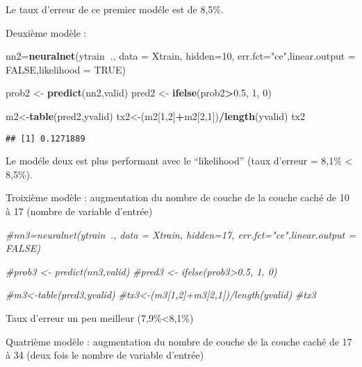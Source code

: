 \documentclass[
]{article}
\newenvironment{Shaded}{\begin{snugshade}}{\end{snugshade}}
\newcommand{\CommentTok}[1]{\textcolor[rgb]{0.56,0.35,0.01}{\textit{#1}}}
\newcommand{\DataTypeTok}[1]{\textcolor[rgb]{0.13,0.29,0.53}{#1}}
\newcommand{\DecValTok}[1]{\textcolor[rgb]{0.00,0.00,0.81}{#1}}
\newcommand{\FloatTok}[1]{\textcolor[rgb]{0.00,0.00,0.81}{#1}}
\newcommand{\KeywordTok}[1]{\textcolor[rgb]{0.13,0.29,0.53}{\textbf{#1}}}
\newcommand{\NormalTok}[1]{#1}
\newcommand{\OperatorTok}[1]{\textcolor[rgb]{0.81,0.36,0.00}{\textbf{#1}}}
\newcommand{\OtherTok}[1]{\textcolor[rgb]{0.56,0.35,0.01}{#1}}
\newcommand{\StringTok}[1]{\textcolor[rgb]{0.31,0.60,0.02}{#1}}
\begin{document}
Le taux d'erreur de ce premier modéle est de 8,5\%.

Deuxième modèle :

\begin{Shaded}
\begin{Highlighting}[]
\NormalTok{nn2=}\KeywordTok{neuralnet}\NormalTok{(ytrain}\OperatorTok{~}\NormalTok{., }\DataTypeTok{data =}\NormalTok{ Xtrain, }\DataTypeTok{hidden=}\DecValTok{10}\NormalTok{, }\DataTypeTok{err.fct=}\StringTok{"ce"}\NormalTok{,}\DataTypeTok{linear.output =} \OtherTok{FALSE}\NormalTok{,}\DataTypeTok{likelihood =} \OtherTok{TRUE}\NormalTok{)}

\NormalTok{prob2 <-}\StringTok{ }\KeywordTok{predict}\NormalTok{(nn2,valid)}
\NormalTok{pred2 <-}\StringTok{ }\KeywordTok{ifelse}\NormalTok{(prob2}\OperatorTok{>}\FloatTok{0.5}\NormalTok{, }\DecValTok{1}\NormalTok{, }\DecValTok{0}\NormalTok{)}

\NormalTok{m2<-}\KeywordTok{table}\NormalTok{(pred2,yvalid)}
\NormalTok{tx2<-(m2[}\DecValTok{1}\NormalTok{,}\DecValTok{2}\NormalTok{]}\OperatorTok{+}\NormalTok{m2[}\DecValTok{2}\NormalTok{,}\DecValTok{1}\NormalTok{])}\OperatorTok{/}\KeywordTok{length}\NormalTok{(yvalid)}
\NormalTok{tx2}
\end{Highlighting}
\end{Shaded}

\begin{verbatim}
## [1] 0.1271889
\end{verbatim}

Le modéle deux est plus performant avec le ``likelihood'' (taux d'erreur
= 8,1\% \textless{} 8,5\%).

Troixième modèle : augmentation du nombre de couche de la couche caché
de 10 à 17 (nombre de variable d'entrée)

\begin{Shaded}
\begin{Highlighting}[]
\CommentTok{#nn3=neuralnet(ytrain~., data = Xtrain, hidden=17, err.fct="ce",linear.output = FALSE)}

\CommentTok{#prob3 <- predict(nn3,valid)}
\CommentTok{#pred3 <- ifelse(prob3>0.5, 1, 0)}

\CommentTok{#m3<-table(pred3,yvalid)}
\CommentTok{#tx3<-(m3[1,2]+m3[2,1])/length(yvalid)}
\CommentTok{#tx3}
\end{Highlighting}
\end{Shaded}

Taux d'erreur un peu meilleur (7,9\%\textless8,1\%)

Quatrième modèle : augmentation du nombre de couche de la couche caché
de 17 à 34 (deux fois le nombre de variable d'entrée)
\end{document}
